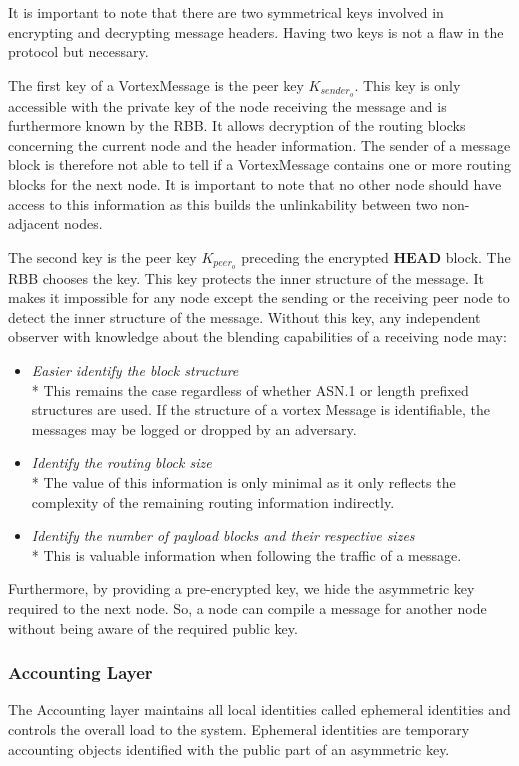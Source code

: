 \documentclass[10pt,journal,compsoc,twocolumn,twoside]{IEEEtran}
\begin{document}
It is important to note that there are two symmetrical keys involved in encrypting and decrypting message headers. Having two keys is not a flaw in the protocol but necessary. 

The first key of a VortexMessage is the peer key $K_{sender_o}$. This key is only accessible with the private key of the node receiving the message and is furthermore known by the RBB. It allows decryption of the routing blocks concerning the current node and the header information. The sender of a message block is therefore not able to tell if a VortexMessage contains one or more routing blocks for the next node. It is important to note that no other node should have access to this information as this builds the unlinkability between two non-adjacent nodes. 

The second key is the peer key $K_{peer_o}$ preceding the encrypted $\mathbf{HEAD}$ block. The RBB chooses the key. This key protects the inner structure of the message. It makes it impossible for any node except the sending or the receiving peer node to detect the inner structure of the message. Without this key, any independent observer with knowledge about the blending capabilities of a receiving node may:
\begin{itemize}
	\item \emph{Easier identify the block structure}\\*
	This remains the case regardless of whether ASN.1 or length prefixed structures are used. If the structure of a vortex Message is identifiable, the messages may be logged or dropped by an adversary.
	\item \emph{Identify the routing block size}\\*
	The value of this information is only minimal as it only reflects the complexity of the remaining routing information indirectly.
	\item \emph{Identify the number of payload blocks and their respective sizes}\\*
	This is valuable information when following the traffic of a message.
\end{itemize}

Furthermore, by providing a pre-encrypted key, we hide the asymmetric key required to the next node. So, a node can compile a message for another node without being aware of the required public key.

\subsubsection{Accounting Layer}
The Accounting layer maintains all local identities called ephemeral identities and controls the overall load to the system. Ephemeral identities are temporary accounting objects identified with the public part of an asymmetric key. 
\end{document}
